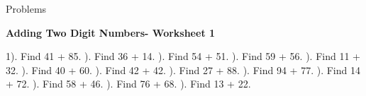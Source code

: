\documentclass{article}%
\begin{document}
%
\huge%
\vspace*{\fill}%
\begin{center}%
Problems%
\end{center}%
\vspace*{\fill}%
\pagebreak%
\normalsize%
\large%
\begin{center}%
\textbf{Adding Two Digit Numbers- Worksheet 1}%
\newline%
\end{center} \normalsize%
1). Find 41 + 85.%
\newline%
\newline%
). Find 36 + 14.%
\newline%
\newline%
). Find 54 + 51.%
\newline%
\newline%
). Find 59 + 56.%
\newline%
\newline%
). Find 11 + 32.%
\newline%
\newline%
). Find 40 + 60.%
\newline%
\newline%
). Find 42 + 42.%
\newline%
\newline%
). Find 27 + 88.%
\newline%
\newline%
). Find 94 + 77.%
\newline%
\newline%
). Find 14 + 72.%
\newline%
\newline%
). Find 58 + 46.%
\newline%
\newline%
). Find 76 + 68.%
\newline%
\newline%
). Find 13 + 22.%
\newline%
\newline%
\end{document}
